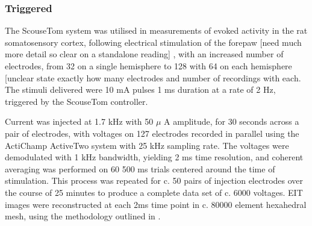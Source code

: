 \subsubsection{Triggered}

The ScouseTom system was utilised in measurements of evoked activity in the rat somatosensory cortex, following electrical stimulation of the forepaw [need much more detail so clear on a standalone reading] \cite{Aristovich_2016} \cite{Vongerichten_2016}, with an increased number of electrodes, from 32 on a single hemisphere to 128 with 64 on each hemisphere [unclear state exactly how many electrodes and number of recordings with each. The stimuli delivered were 10 mA pulses 1 ms duration at a rate of 2 Hz, triggered by the ScouseTom controller.

Current was injected at 1.7 kHz with 50 $\mu$ A amplitude, for 30 seconds across a pair of electrodes, with voltages on 127 electrodes recorded in parallel using the ActiChamp ActiveTwo system with 25 kHz sampling rate. The voltages were demodulated with 1 kHz bandwidth, yielding 2 ms time resolution, and coherent averaging was performed on 60 500 ms trials centered around the time of stimulation. This process was repeated for c. 50 pairs of injection electrodes over the course of 25 minutes to produce a complete data set of c. 6000 voltages. EIT images were reconstructed at each 2ms time point in c. 80000 element hexahedral mesh, using the methodology outlined in \cite{Aristovich_2014}.
